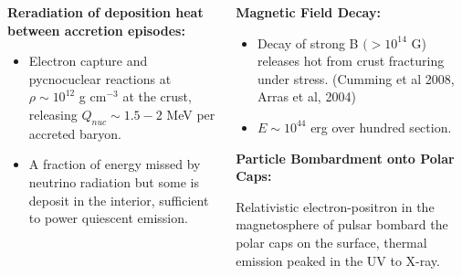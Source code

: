 \begin{frame}
\begin{columns}[c]
\begin{column}{0.5\textwidth} 
	{\bf \center Reradiation of deposition heat between accretion episodes:}

	
 	{\scriptsize 
	  \begin{itemize}
	   \item Electron capture and pycnocuclear reactions at $\rho \sim 10^{12}$ g cm$^{-3}$ at the crust, releasing $Q_{nuc} \sim 1.5-2$ MeV per accreted baryon.
	   
	   \quad
	   
	   \item A fraction of energy missed by neutrino radiation but some is deposit in the interior, sufficient to power quiescent emission.
	  \end{itemize}
	}    
\end{column}
\begin{column}{0.5\textwidth}  
	{\bf \center Magnetic Field Decay:}
	

 	{\scriptsize 
	  \begin{itemize}
	  \item Decay of strong B $(>10^{14}$ G) releases hot from crust fracturing under stress. {\tiny (Cumming et al 2008, Arras et al, 2004)}
	  
	  \quad
	  
	  \item $E\sim 10^{44}$ erg over hundred section.
	  \end{itemize}
	}   
	\quad
	
		{\bf \center Particle Bombardment onto Polar Caps:}
		
		
 	\scriptsize{ Relativistic electron-positron in the magnetosphere of pulsar bombard the polar caps on the surface, thermal emission peaked in the UV to X-ray. }


\end{column}
\end{columns}
\end{frame}



